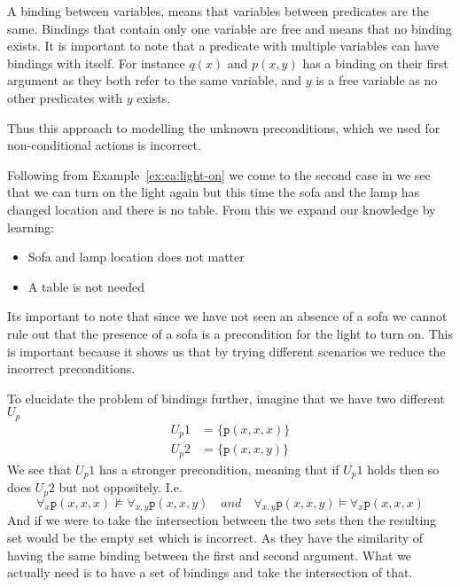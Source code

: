 \documentclass[../Master.tex]{subfiles}
\begin{document}
\begin{definition}[Binding]\label{def:ca:binding}
    A binding between variables, means that variables between predicates are the same.
	Bindings that contain only one variable are free and means that no binding exists.
	It is important to note that a predicate with multiple variables can have bindings with itself.
	For instance $q(x)$ and $p(x,y)$ has a binding on their first argument as they both refer to the same variable, and $y$ is a free variable as no other predicates with $y$ exists.
\end{definition}
Thus this approach to modelling the unknown preconditions, which we used for non-conditional actions is incorrect.

\begin{example}\label{ex:ca:light-on-2}
    Following from Example~\ref{ex:ca:light-on} we come to the second case in 
    we see that we can turn on the light again but this time the sofa and the lamp has changed location and
    there is no table. From this we expand our knowledge by learning:
    \begin{itemize}
        \item Sofa and lamp location does not matter
        \item A table is not needed
    \end{itemize}
    Its important to note that since we have not seen an absence of a sofa we cannot rule out that the presence of a sofa is a precondition for the light to turn on. This is important because it shows us that by trying different scenarios we reduce the incorrect preconditions.
\end{example}

\begin{example}\label{ex:ca:nonbinding-intersection-model}
    To elucidate the problem of bindings further, imagine that we have two different $U_p$
    \begin{align*}
        U_p1 &= \{ \texttt{p}(x, x, x) \} \\
        U_p2 &= \{ \texttt{p}(x, x, y) \}
    \end{align*}
    We see that $U_p1$ has a stronger precondition, meaning that if $U_p1$ holds then so does $U_p2$ but not oppositely. I.e.\ 
    \begin{equation*}
    \forall_{x} \texttt{p}(x, x, x) \nvDash \forall_{x, y} \texttt{p}(x, x, y)  \quad and \quad
     \forall_{x, y} \texttt{p}(x, x, y) \vDash \forall_{x} \texttt{p}(x, x, x) 
    \end{equation*}
    And if we were to take the intersection between the two sets then the resulting set would be the empty set which is incorrect. As they have the similarity of having the same binding between the first and second argument. What we actually need is to have a set of bindings and take the intersection of that.
\end{example}
\end{document}
